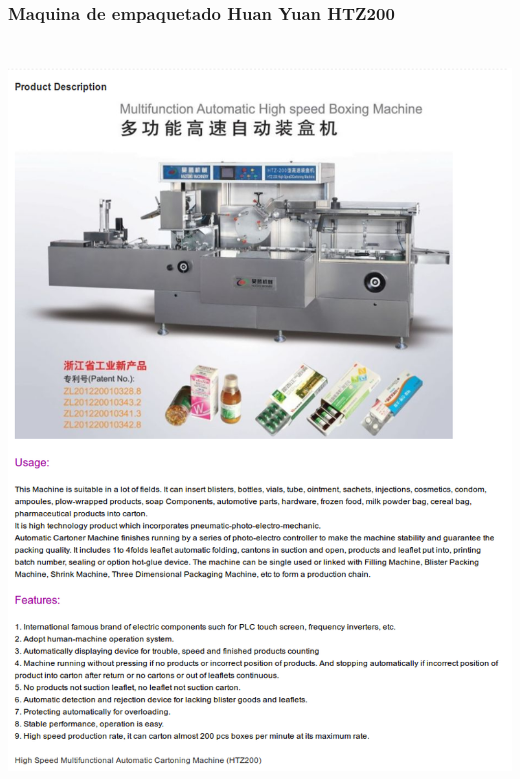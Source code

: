 \subsubsection{Maquina de empaquetado Huan Yuan HTZ200}
\includegraphics[width=15cm,height=20cm,keepaspectratio]{Datasheets/7MaquinaEmpaquetado.png} 
\newpage
